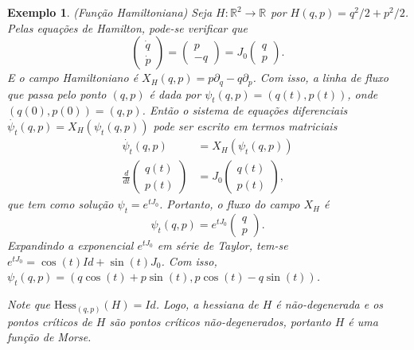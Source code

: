 \documentclass[12pt]{book}
\newtheorem{exemplo}[teorema]{Exemplo}
\newcommand{\campohamiltoniano}[1]{X_{H}(#1)}
\newcommand{\campohamiltonianoabrev}{X_{H}}
\newcommand{\derivada}[2]{\frac{d #1}{d #2}}
\newcommand{\estruturacomplexa}{J_{0}}
\newcommand{\hessianaponto}[2]{\text{Hess}_{#1}(#2)}
\newcommand{\real}[1]{\mathbb{R}^{#1}}
\newcommand{\reta}{\real{}}
\begin{document}
	\begin{exemplo}\label{exemplo_funcao_hamiltoniana}
		(Função Hamiltoniana) Seja $H:\real{2} \to \reta$ por $H(q,p) = q^{2}/2+p^{2}/2$. Pelas equações de Hamilton, pode-se verificar que 
		$$
			\left(
			\begin{array}{c}
			\dot{q}
			\\
			\dot{p}
			\end{array}
			\right) = 
			\left(
			\begin{array}{c}
			p
			\\
			-q
			\end{array}
			\right)
			=\estruturacomplexa
			\left(
			\begin{array}{c}
			q
			\\
			p
			\end{array}
			\right).
		$$
		E o campo Hamiltoniano é $\campohamiltoniano{q,p} = p\partial_{q}-q\partial_{p}$. Com isso, a linha de fluxo que passa pelo ponto $(q,p)$ é dada por $\psi_{t}(q,p) = (q(t), p(t))$, onde $(q(0), p(0)) = (q, p)$. Então o sistema de equações diferenciais $\dot{\psi_{t}}(q,p) = \campohamiltoniano{\psi_{t}(q,p)}$ pode ser escrito em termos matriciais
		$$
		\begin{aligned}
		\dot{\psi_{t}}(q,p) &=  \campohamiltoniano{\psi_{t}(q,p)}
		\\
		\derivada{}{t}\left(
		\begin{array}{c}
		q(t)
		\\
		p(t)
		\end{array}
		\right)
		&=
		\estruturacomplexa
		\left(
		\begin{array}{c}
		q(t)
		\\
		p(t)
		\end{array}
		\right),
		\end{aligned}
		$$ 
		que tem como solução $\psi_{t}=e^{t\estruturacomplexa}$. Portanto, o fluxo do campo $\campohamiltonianoabrev$ é
		$$
		\psi_{t}(q,p) = e^{t\estruturacomplexa}
		\left(
		\begin{array}{c}
		q
		\\
		p
		\end{array}
		\right).
		$$
		Expandindo a exponencial $e^{t\estruturacomplexa}$ em série de Taylor, tem-se $e^{t\estruturacomplexa}=\cos(t)Id+\sin(t)\estruturacomplexa$. Com isso, $		\psi_{t}(q,p)=(q\cos(t)+p\sin(t), p\cos(t)-q\sin(t))$.
		
		Note que $\hessianaponto{(q,p)}{H} = Id$. Logo, a hessiana de $H$ é não-degenerada e os pontos críticos de $H$ são pontos críticos não-degenerados, portanto $H$ é uma função de Morse.
		

\end{exemplo}
\end{document}
